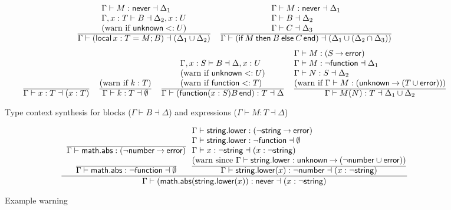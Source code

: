 \documentclass[sigplan]{acmart}
\makeatletter
\newcommand{\infer}[2]{\frac{\displaystyle\begin{array}{@{}l@{}}#1\end{array}}{\displaystyle#2}}
\newcommand{\LOCAL}{\mathop{\mathsf{local}}}
\newcommand{\FUNCTION}{\mathop{\mathsf{function}}}
\newcommand{\IF}{\mathop{\mathsf{if}}}
\newcommand{\THEN}{\mathbin{\mathsf{then}}}
\newcommand{\ELSE}{\mathbin{\mathsf{else}}}
\newcommand{\END}{\mathop{\mathsf{end}}}
\newcommand{\NEVER}{\mathsf{never}}
\newcommand{\ERROR}{\mathsf{error}}
\newcommand{\UNKNOWN}{\mathsf{unknown}}
\newcommand{\STRING}{\mathsf{string}}
\newcommand{\NUMBER}{\mathsf{number}}
\newcommand{\MATH}{\mathsf{math}}
\newcommand{\ABS}{\mathsf{abs}}
\newcommand{\LOWER}{\mathsf{lower}}
\newcommand{\fun}{\mathbin{\rightarrow}}
\makeatother
\begin{document}
\begin{figure*}
  \[\begin{array}{c}
    \infer{
      \Gamma \vdash M : \NEVER \dashv \Delta_1 \\
      \Gamma, x : T \vdash B \dashv \Delta_2, x : U \\
      \mbox{(warn if $\UNKNOWN <: U$)}
    }{
      \Gamma \vdash (\LOCAL x : T = M; B) \dashv (\Delta_1 \cup \Delta_2)
    }
    \quad
    \infer{
      \Gamma \vdash M : \NEVER \dashv \Delta_1 \\
      \Gamma \vdash B \dashv \Delta_2 \\
      \Gamma \vdash C \dashv \Delta_3 
    }{
      \Gamma \vdash (\IF M \THEN B \ELSE C \END) \dashv (\Delta_1 \cup (\Delta_2 \cap \Delta_3))
    }
  \\[\bigskipamount]
    \infer{}{
      \Gamma \vdash x : T \dashv (x : T)
    }
    \quad
    \infer{
      \mbox{(warn if $k:T$)}
    }{
      \Gamma \vdash k : T \dashv \emptyset
    }
    \quad
    \infer{
      \Gamma, x:S \vdash B \dashv \Delta, x:U \\
      \mbox{(warn if $\UNKNOWN <: U$)}\\
      \mbox{(warn if ${\FUNCTION} <: T$)}
    }{
      \Gamma \vdash (\FUNCTION (x : S) B \END) : T \dashv \Delta
    }
    \quad
    \infer{
      \Gamma \vdash M : (S \fun \ERROR) \\
      \Gamma \vdash M : \neg{\FUNCTION} \dashv \Delta_1 \\
      \Gamma \vdash N : S \dashv \Delta_2  \\
      \mbox{(warn if $\Gamma \vdash M : (\UNKNOWN \fun (T \cup \ERROR))$)}
    }{
      \Gamma \vdash M(N) : T \dashv \Delta_1 \cup \Delta_2
    }
  \end{array}\]
  \caption{Type context synthesis for blocks ($\Gamma \vdash B \dashv \Delta$) and expressions ($\Gamma \vdash M:T \dashv \Delta$)}
  \label{fig:ctxtgen}
\end{figure*}

\begin{figure*}
  \[
    \infer{
      \begin{array}[b]{c}
      \infer{}{\Gamma \vdash \MATH.\ABS : (\neg\NUMBER \fun \ERROR)} \\[\bigskipamount]
      \infer{}{\Gamma \vdash \MATH.\ABS : \neg{\FUNCTION} \dashv \emptyset}
      \end{array}
      \infer{
        \Gamma \vdash \STRING.\LOWER : (\neg\STRING \fun \ERROR) \\
        \Gamma \vdash \STRING.\LOWER : \neg{\FUNCTION} \dashv \emptyset \\
        \Gamma \vdash x : \neg{\STRING} \dashv (x : \neg\STRING) \\
        \mbox{(warn since $\Gamma \vdash \STRING.\LOWER : \UNKNOWN \fun (\neg\NUMBER \cup \ERROR)$)}
      }{\Gamma \vdash \STRING.\LOWER(x) : \neg{\NUMBER} \dashv (x : \neg\STRING)}
    }{\Gamma \vdash (\MATH.\ABS(\STRING.\LOWER(x)) : \NEVER \dashv (x : \neg\STRING)}
  \]
  \caption{Example warning}
  \label{fig:example}
\end{figure*}
\end{document}

